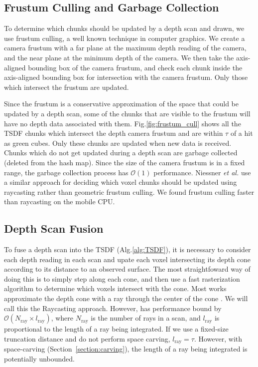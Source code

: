 \documentclass[conference]{IEEEtran}
\newcommand{\sref}[1]{Section~\ref{#1}}
\newcommand{\figref}[1]{Fig.\ref{#1}}
\newcommand{\algoref}[1]{Alg.\ref{#1}}
\newcommand{\etal}{\textit{et al. }}
\begin{document}
\subsection{Frustum Culling and Garbage Collection}
\label{section:frustum}
To determine which chunks should be updated by a depth scan and drawn, we use
frustum culling, a well known technique in computer graphics. We  create a
camera frustum with a far plane at the maximum depth reading of the camera, and
the near plane at the minimum depth of the camera. We then take the 
axis-aligned bounding box of the camera frustum, and check each chunk inside the
axis-aligned bounding box for intersection with the camera frustum. Only those
which intersect the frustum are updated.

Since the frustum is a conservative approximation of the space that could be
updated by a depth scan, some of the chunks that are visible to the frustum will
have no depth data associated with them. \figref{fig:frustum_cull} shows all the
TSDF chunks which intersect the depth camera frustum and are within $\tau$ of
a hit as green cubes. Only these chunks are updated when new data is received. 
Chunks which do not get updated during a depth scan are garbage collected
(deleted from the hash map). Since the size of the camera frustum is in a fixed
range, the garbage collection process has $\mathcal{O}(1)$ performance. Niessner
\etal \cite{NiessnerHashing} use a similar approach for deciding which voxel
chunks should be updated using raycasting rather than geometric frustum
culling. We found frustum culling faster than raycasting on the mobile CPU.

\subsection{Depth Scan Fusion}
\label{section:scan_integration}
To fuse a depth scan into the TSDF (\algoref{alg:TSDF}), it is necessary
to consider each depth reading in each scan and upate each
voxel intersecting its depth cone according to its distance to an observed
surface. The most straightfoward way of doing this is to simply step along
each cone, and then use a fast rasterization algorithm \cite{RayTracing} to determine which voxels
intersect with the cone. Most works  approximate the depth cone with a ray
through the center of the cone \cite{Newcombe, NiessnerHashing}. We will call
this the Raycasting approach. However, has performance bound by
$\mathcal{O}(N_{\text{ray}} \times l_{\text{ray}})$, where $N_{\text{ray}}$ is
the number of rays in a scan, and $l_{\text{ray}}$  is proportional to the
length of a ray being integrated. If we use a fixed-size truncation distance
and do not perform space carving, $l_{\text{ray}} = \tau$.
However, with space-carving (\sref{section:carving}), the length of a ray
being integrated is potentially unbounded.
\end{document}
